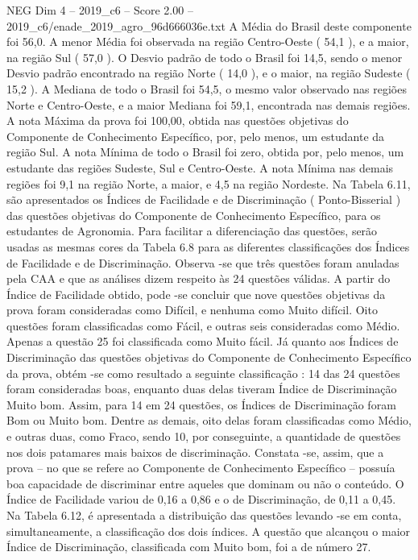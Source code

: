 \begin{textsample}{NEG Dim 4 – 2019\_c6 – Score 2.00 – 2019\_c6/enade\_2019\_agro\_96d666036e.txt}
A Média do Brasil deste componente foi 56,0.
A menor Média foi observada na região Centro-Oeste ( 54,1 ), e a maior, na região Sul ( 57,0 ).
O Desvio padrão de todo o Brasil foi 14,5, sendo o menor Desvio padrão encontrado na região Norte ( 14,0 ), e o maior, na região Sudeste ( 15,2 ).
A Mediana de todo o Brasil foi 54,5, o mesmo valor observado nas regiões Norte e Centro-Oeste, e a maior Mediana foi 59,1, encontrada nas demais regiões.
A nota Máxima da prova foi 100,00, obtida nas questões objetivas do Componente de Conhecimento Específico, por, pelo menos, um estudante da região Sul.
A nota Mínima de todo o Brasil foi zero, obtida por, pelo menos, um estudante das regiões Sudeste, Sul e Centro-Oeste.
A nota Mínima nas demais regiões foi 9,1 na região Norte, a maior, e 4,5 na região Nordeste.
Na Tabela 6.11, são apresentados os Índices de Facilidade e de Discriminação ( Ponto-Bisserial ) das questões objetivas do Componente de Conhecimento Específico, para os estudantes de Agronomia.
Para facilitar a diferenciação das questões, serão usadas as mesmas cores da Tabela 6.8 para as diferentes classificações dos Índices de Facilidade e de Discriminação.
Observa -se que três questões foram anuladas pela CAA e que as análises dizem respeito às 24 questões válidas.
A partir do Índice de Facilidade obtido, pode -se concluir que nove questões objetivas da prova foram consideradas como Difícil, e nenhuma como Muito difícil.
Oito questões foram classificadas como Fácil, e outras seis consideradas como Médio.
Apenas a questão 25 foi classificada como Muito fácil.
Já quanto aos Índices de Discriminação das questões objetivas do Componente de Conhecimento Específico da prova, obtém -se como resultado a seguinte classificação : 14 das 24 questões foram consideradas boas, enquanto duas delas tiveram Índice de Discriminação Muito bom.
Assim, para 14 em 24 questões, os Índices de Discriminação foram Bom ou Muito bom.
Dentre as demais, oito delas foram classificadas como Médio, e outras duas, como Fraco, sendo 10, por conseguinte, a quantidade de questões nos dois patamares mais baixos de discriminação.
Constata -se, assim, que a prova – no que se refere ao Componente de Conhecimento Específico – possuía boa capacidade de discriminar entre aqueles que dominam ou não o conteúdo.
O Índice de Facilidade variou de 0,16 a 0,86 e o de Discriminação, de 0,11 a 0,45.
Na Tabela 6.12, é apresentada a distribuição das questões levando -se em conta, simultaneamente, a classificação dos dois índices.
A questão que alcançou o maior Índice de Discriminação, classificada com Muito bom, foi a de número 27.

\end{textsample}

